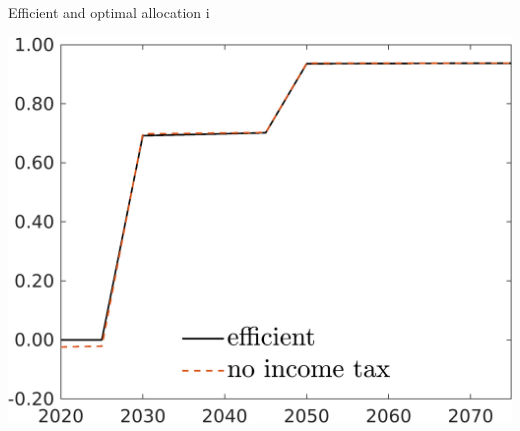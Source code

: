 \documentclass[11pt,aspectratio=169]{beamer}
\begin{document}
\addtocounter{framenumber}{-1}
\begin{frame}{Efficient and optimal allocation i}
	\centering
	\begin{minipage}[]{0.32\textwidth}
		\includegraphics[width=1\textwidth]{../codding_model/own_basedOnFried/optimalPol_elastS_DisuSci/figures/all_1705/tauf_CompEffOPT_T_NoTaus_noopt_spillover0_noskill0_sep1_BN0_ineq0_red0_xgrowth0_zero0_countec0_etaa0.79_lgd1.png}
	\end{minipage}
\begin{minipage}[]{0.05\textwidth}
	\ \ \\ 
	\ \ 
\end{minipage}
	\begin{minipage}[]{0.32\textwidth}

\end{minipage}
\end{frame}
\end{document}
